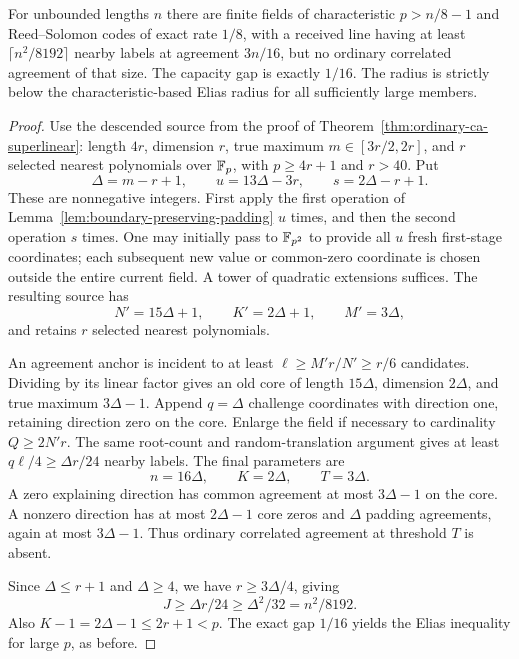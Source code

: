 \begin{corollary}
\label{cor:ordinary-ca-fixed-gap}
For unbounded lengths $n$ there are finite fields of characteristic
$p>n/8-1$ and Reed--Solomon codes of exact rate $1/8$, with a received
line having at least $\lceil n^2/8192\rceil$ nearby labels at agreement
$3n/16$, but no ordinary correlated agreement of that size. The capacity
gap is exactly $1/16$. The radius is strictly below the characteristic-based
Elias radius for all sufficiently large members.
\end{corollary}
\begin{proof}
Use the descended source from the proof of
Theorem~\ref{thm:ordinary-ca-superlinear}: length $4r$, dimension $r$,
true maximum $m\in[3r/2,2r]$, and $r$ selected nearest polynomials over
$\mathbb F_p$, with $p\ge4r+1$ and $r>40$. Put
\[
 \Delta=m-r+1,\qquad u=13\Delta-3r,\qquad s=2\Delta-r+1.
\]
These are nonnegative integers. First apply the first operation of
Lemma~\ref{lem:boundary-preserving-padding} $u$ times, and then the second
operation $s$ times. One may initially pass to $\mathbb F_{p^2}$ to provide
all $u$ fresh first-stage coordinates; each subsequent new value or
common-zero coordinate is chosen outside the entire current field.
A tower of quadratic extensions suffices. The resulting source has
\[
 N'=15\Delta+1,\qquad K'=2\Delta+1,\qquad M'=3\Delta,
\]
and retains $r$ selected nearest polynomials.

An agreement anchor is incident to at least
$\ell\ge M'r/N'\ge r/6$ candidates. Dividing by its linear factor gives
an old core of length $15\Delta$, dimension $2\Delta$, and true maximum
$3\Delta-1$. Append $q=\Delta$ challenge coordinates with direction one,
retaining direction zero on the core. Enlarge the field if necessary to
cardinality $Q\ge2N'r$. The same root-count and random-translation
argument gives at least $q\ell/4\ge\Delta r/24$ nearby labels.
The final parameters are
\[
 n=16\Delta,\qquad K=2\Delta,\qquad T=3\Delta.
\]
A zero explaining direction has common agreement at most $3\Delta-1$
on the core. A nonzero direction has at most $2\Delta-1$ core zeros and
$\Delta$ padding agreements, again at most $3\Delta-1$.
Thus ordinary correlated agreement at threshold $T$ is absent.

Since $\Delta\le r+1$ and $\Delta\ge4$, we have $r\ge3\Delta/4$, giving
\[
 J\ge\Delta r/24\ge\Delta^2/32=n^2/8192.
\]
Also $K-1=2\Delta-1\le2r+1<p$. The exact gap $1/16$ yields the Elias
inequality for large $p$, as before.
\end{proof}

